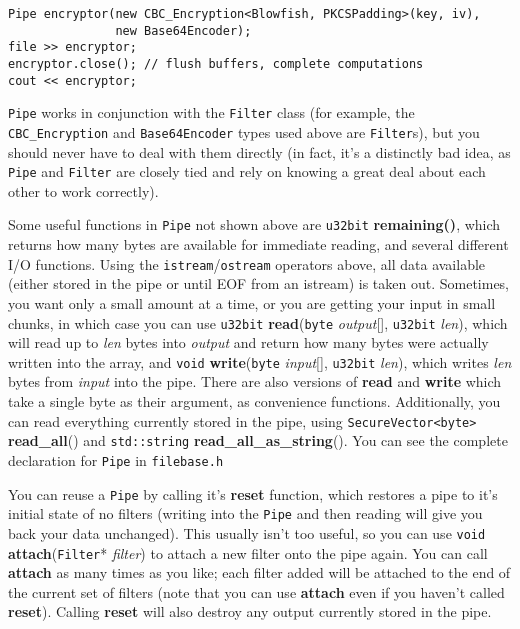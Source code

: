 \documentclass{article}
\newcommand{\filename}[1]{\texttt{#1}}
\newcommand{\function}[1]{\textbf{#1}}
\newcommand{\type}[1]{\texttt{#1}}
\renewcommand{\arg}[1]{\textsl{#1}}
\begin{document}
\begin{verbatim}
Pipe encryptor(new CBC_Encryption<Blowfish, PKCSPadding>(key, iv),
               new Base64Encoder);
file >> encryptor;
encryptor.close(); // flush buffers, complete computations
cout << encryptor;
\end{verbatim}

\type{Pipe} works in conjunction with the \type{Filter} class (for example, the
\type{CBC\_Encryption} and \type{Base64Encoder} types used above are
\type{Filter}s), but you should never have to deal with them directly (in fact,
it's a distinctly bad idea, as \type{Pipe} and \type{Filter} are closely tied
and rely on knowing a great deal about each other to work correctly).

Some useful functions in \type{Pipe} not shown above are \type{u32bit}
\function{remaining()}, which returns how many bytes are available for
immediate reading, and several different I/O functions. Using the
\type{istream}/\type{ostream} operators above, all data available (either
stored in the pipe or until EOF from an istream) is taken out. Sometimes, you
want only a small amount at a time, or you are getting your input in small
chunks, in which case you can use \type{u32bit} \function{read}(\type{byte}
\arg{output}[], \type{u32bit} \arg{len}), which will read up to \arg{len} bytes
into \arg{output} and return how many bytes were actually written into the
array, and \type{void} \function{write}(\type{byte} \arg{input}[],
\type{u32bit} \arg{len}), which writes \arg{len} bytes from \arg{input} into
the pipe. There are also versions of \function{read} and \function{write} which
take a single byte as their argument, as convenience functions.
Additionally, you can read everything currently stored in the pipe, using
\type{SecureVector<byte>} \function{read\_all}() and
\type{std::string} \function{read\_all\_as\_string}(). You can see the
complete declaration for \type{Pipe} in \filename{filebase.h}

You can reuse a \type{Pipe} by calling it's \function{reset} function, which
restores a pipe to it's initial state of no filters (writing into the
\type{Pipe} and then reading will give you back your data unchanged).  This
usually isn't too useful, so you can use \type{void}
\function{attach}(\type{Filter}* \arg{filter}) to attach a new filter onto the
pipe again. You can call \function{attach} as many times as you like; each
filter added will be attached to the end of the current set of filters (note
that you can use \function{attach} even if you haven't called
\function{reset}). Calling \function{reset} will also destroy any output
currently stored in the pipe.
\end{document}
